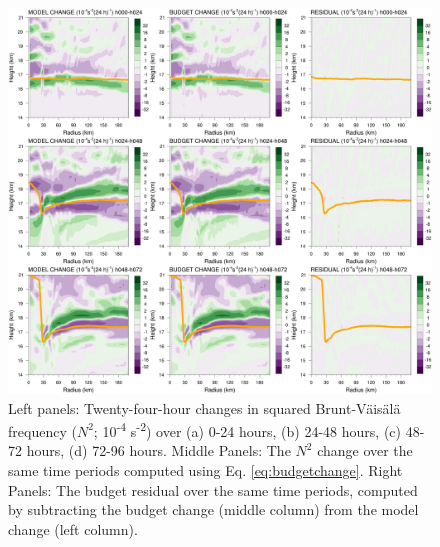 \documentclass{ametsoc}
\begin{document}
\begin{figure}[ht]
\centerline{\includegraphics[width=39pc]{figures/mod+bud+res.png}}
\caption{Left panels: Twenty-four-hour changes in squared Brunt-V{\"a}is{\"a}l{\"a} frequency ($N^2$; 10\textsuperscript{-4} s\textsuperscript{-2}) over (a) 0-24 hours, (b) 24-48 hours, (c) 48-72 hours, (d) 72-96 hours. Middle Panels: The $N^2$ change over the same time periods computed using Eq. \ref{eq:budgetchange}. Right Panels: The budget residual over the same time periods, computed by subtracting the budget change (middle column) from the model change (left column).}
\label{fig:mod+bud+res}
\end{figure}
\end{document}
